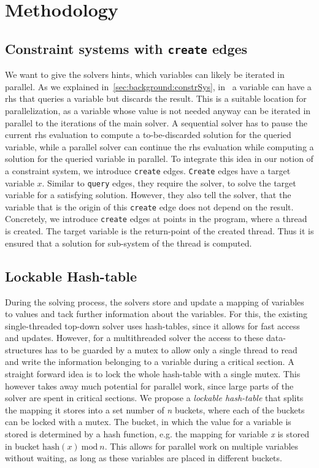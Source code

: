 \section{Methodology}
\label{sec:method}


  \subsection{Constraint systems with \texttt{create} edges}
  \label{sec:method:create}
  We want to give the solvers hints, which variables can likely be iterated in parallel. As we explained in~\autoref{sec:background:constrSys}, in \gob\ a variable can have a \ac{rhs} that queries a variable but discards the result. This is a suitable location for parallelization, as a variable whose value is not needed anyway can be iterated in parallel to the iterations of the main solver. A sequential solver has to pause the current \ac{rhs} evaluation to compute a to-be-discarded solution for the queried variable, while a parallel solver can continue the \ac{rhs} evaluation while computing a solution for the queried variable in parallel.
  To integrate this idea in our notion of a constraint system, we introduce \texttt{create} edges. \texttt{Create} edges have a target variable $x$. Similar to \texttt{query} edges, they require the solver, to solve the target variable for a satisfying solution. However, they also tell the solver, that the variable that is the origin of this \texttt{create} edge does not depend on the result. Concretely, we introduce \texttt{create} edges at points in the program, where a thread is created. The target variable is the return-point of the created thread. Thus it is ensured that a solution for sub-system of the thread is computed.

  \subsection{Lockable Hash-table}
  \label{sec:method:LHM}
  During the solving process, the solvers store and update a mapping of variables to values and tack further information about the variables. For this, the existing single-threaded top-down solver uses hash-tables, since it allows for fast access and updates. However, for a multithreaded solver the access to these data-structures has to be guarded by a mutex to allow only a single thread to read and write the information belonging to a variable during a critical section. 
  A straight forward idea is to lock the whole hash-table with a single mutex. This however takes away much potential for parallel work, since large parts of the solver are spent in critical sections.
  We propose a \textit{lockable hash-table} that splits the mapping it stores into a set number of \textit{n} buckets, where each of the buckets can be locked with a mutex. The bucket, in which the value for a variable is stored is determined by a hash function, e.g. the mapping for variable \textit{x} is stored in bucket $\text{hash}(x)\ \text{mod}\ n$. This allows for parallel work on multiple variables without waiting, as long as these variables are placed in different buckets.

